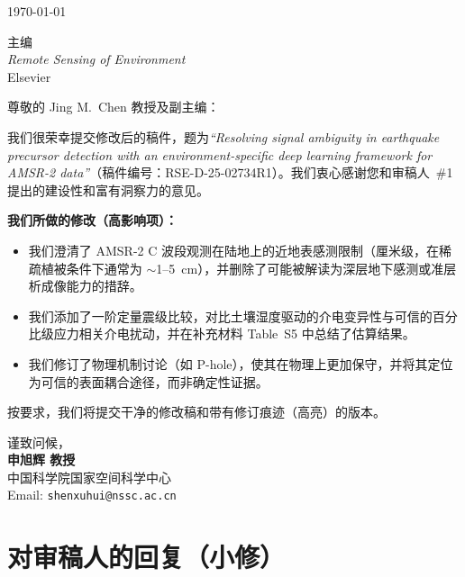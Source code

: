 \documentclass[11pt]{article}
\begin{document}
\begin{flushright}
\today
\end{flushright}

\bigskip

主编\\
\textit{Remote Sensing of Environment}\\
Elsevier

\bigskip

尊敬的 Jing M.~Chen 教授及副主编：

\medskip

我们很荣幸提交修改后的稿件，题为\textit{``Resolving signal ambiguity in earthquake precursor detection with an environment-specific deep learning framework for AMSR-2 data''}（稿件编号：RSE-D-25-02734R1）。我们衷心感谢您和审稿人~\#1 提出的建设性和富有洞察力的意见。

\medskip

\noindent\textbf{我们所做的修改（高影响项）：}
\begin{itemize}[leftmargin=*, nosep]
  \item 我们澄清了 AMSR-2 C 波段观测在陆地上的近地表感测限制（厘米级，在稀疏植被条件下通常为 $\sim$1--5~cm），并删除了可能被解读为深层地下感测或准层析成像能力的措辞。
  \item 我们添加了一阶定量震级比较，对比土壤湿度驱动的介电变异性与可信的百分比级应力相关介电扰动，并在补充材料 Table~S5 中总结了估算结果。
  \item 我们修订了物理机制讨论（如 P-hole），使其在物理上更加保守，并将其定位为可信的表面耦合途径，而非确定性证据。
\end{itemize}

\medskip

按要求，我们将提交干净的修改稿和带有修订痕迹（高亮）的版本。

\medskip

谨致问候，\\[0.5em]
\textbf{申旭辉 教授}\\
中国科学院国家空间科学中心\\
Email: \texttt{shenxuhui@nssc.ac.cn}

\clearpage

\section*{对审稿人的回复（小修）}
\end{document}
